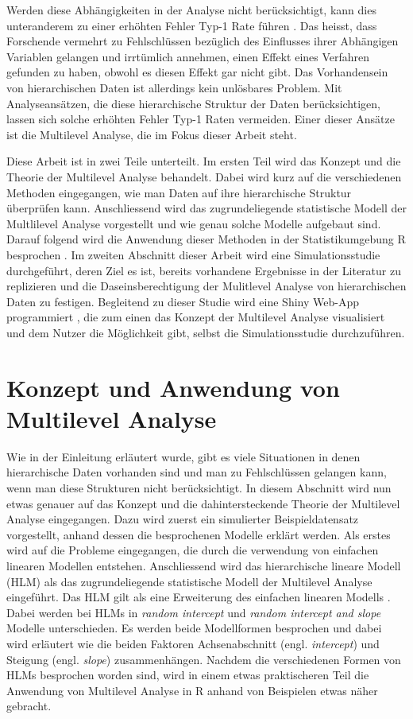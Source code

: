 \documentclass[12pt]{article}\usepackage[]{graphicx}\usepackage[]{color}
\begin{document}
Werden diese Abhängigkeiten in der Analyse nicht berücksichtigt, kann dies unteranderem zu einer erhöhten Fehler Typ-1 Rate führen \citep{dorman2008effect, mcneish2014analyzing}. Das heisst, dass Forschende vermehrt zu Fehlschlüssen bezüglich des Einflusses ihrer Abhängigen Variablen gelangen und irrtümlich annehmen, einen Effekt eines Verfahren gefunden zu haben, obwohl es diesen Effekt gar nicht gibt. Das Vorhandensein von hierarchischen Daten ist allerdings kein unlösbares Problem. Mit Analyseansätzen, die diese hierarchische Struktur der Daten berücksichtigen, lassen sich solche erhöhten Fehler Typ-1 Raten vermeiden. Einer dieser Ansätze ist die Multilevel Analyse, die im Fokus dieser Arbeit steht.

Diese Arbeit ist in zwei Teile unterteilt. Im ersten Teil wird das Konzept und die Theorie der Multilevel Analyse behandelt. Dabei wird kurz auf die verschiedenen Methoden eingegangen, wie man Daten auf ihre hierarchische Struktur überprüfen kann. Anschliessend wird das zugrundeliegende statistische Modell der Multlilevel Analyse vorgestellt und wie genau solche Modelle aufgebaut sind. Darauf folgend wird die Anwendung dieser Methoden in der Statistikumgebung R besprochen \citep{R}. Im zweiten Abschnitt dieser Arbeit wird eine Simulationsstudie durchgeführt, deren Ziel es ist, bereits vorhandene Ergebnisse in der Literatur zu replizieren und die Daseinsberechtigung der Mulitlevel Analyse von hierarchischen Daten zu festigen. Begleitend zu dieser Studie wird eine Shiny Web-App programmiert \citep{shiny}, die zum einen das Konzept der Multilevel Analyse visualisiert und dem Nutzer die Möglichkeit gibt, selbst die Simulationsstudie durchzuführen. 

\section{Konzept und Anwendung von Multilevel Analyse}
Wie in der Einleitung erläutert wurde, gibt es viele Situationen in denen hierarchische Daten vorhanden sind und man zu Fehlschlüssen gelangen kann, wenn man diese Strukturen nicht berücksichtigt. In diesem Abschnitt wird nun etwas genauer auf das Konzept und die dahintersteckende Theorie der Multilevel Analyse eingegangen. Dazu wird zuerst ein simulierter Beispieldatensatz vorgestellt, anhand dessen die besprochenen Modelle erklärt werden. Als erstes wird auf die Probleme eingegangen, die durch die verwendung von einfachen linearen Modellen entstehen. Anschliessend wird das hierarchische lineare Modell (HLM) als das zugrundeliegende statistische Modell der Multilevel Analyse eingeführt. Das HLM gilt als eine Erweiterung des einfachen linearen Modells \cite{SnijdersTomA.B2012Ma:a}. Dabei werden bei HLMs in \textit{random intercept} und \textit{random intercept and slope} Modelle unterschieden. Es werden beide Modellformen besprochen und dabei wird erläutert wie die beiden Faktoren Achsenabschnitt (engl. \textit{intercept}) und Steigung (engl. \textit{slope}) zusammenhängen. Nachdem die verschiedenen Formen von HLMs besprochen worden sind, wird in einem etwas praktischeren Teil die Anwendung von Multilevel Analyse in R anhand von Beispielen etwas näher gebracht.
\end{document}
